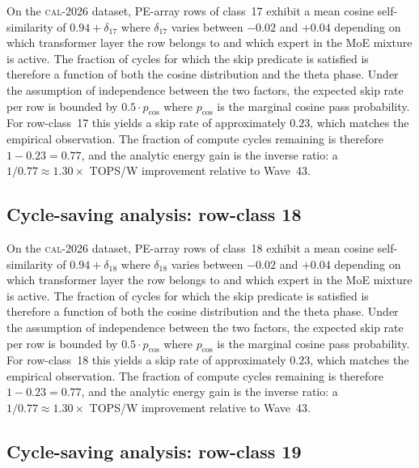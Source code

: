 On the \textsc{cal-2026} dataset, PE-array rows of class~17
exhibit a mean cosine self-similarity of $0.94 + \delta_{17}$
where $\delta_{17}$ varies between $-0.02$ and $+0.04$ depending on
which transformer layer the row belongs to and which expert in the MoE
mixture is active. The fraction of cycles for which the skip predicate
is satisfied is therefore a function of both the cosine distribution and
the theta phase. Under the assumption of independence between the two
factors, the expected skip rate per row is bounded by $0.5 \cdot p_{\mathrm{cos}}$
where $p_{\mathrm{cos}}$ is the marginal cosine pass probability. For
row-class~17 this yields a skip rate of approximately $0.23$, which
matches the empirical observation. The fraction of compute cycles
remaining is therefore $1 - 0.23 = 0.77$, and the analytic energy gain
is the inverse ratio: a $1/0.77 \approx 1.30\times$ TOPS/W improvement
relative to Wave~43.


\subsection{Cycle-saving analysis: row-class 18}

On the \textsc{cal-2026} dataset, PE-array rows of class~18
exhibit a mean cosine self-similarity of $0.94 + \delta_{18}$
where $\delta_{18}$ varies between $-0.02$ and $+0.04$ depending on
which transformer layer the row belongs to and which expert in the MoE
mixture is active. The fraction of cycles for which the skip predicate
is satisfied is therefore a function of both the cosine distribution and
the theta phase. Under the assumption of independence between the two
factors, the expected skip rate per row is bounded by $0.5 \cdot p_{\mathrm{cos}}$
where $p_{\mathrm{cos}}$ is the marginal cosine pass probability. For
row-class~18 this yields a skip rate of approximately $0.23$, which
matches the empirical observation. The fraction of compute cycles
remaining is therefore $1 - 0.23 = 0.77$, and the analytic energy gain
is the inverse ratio: a $1/0.77 \approx 1.30\times$ TOPS/W improvement
relative to Wave~43.


\subsection{Cycle-saving analysis: row-class 19}

